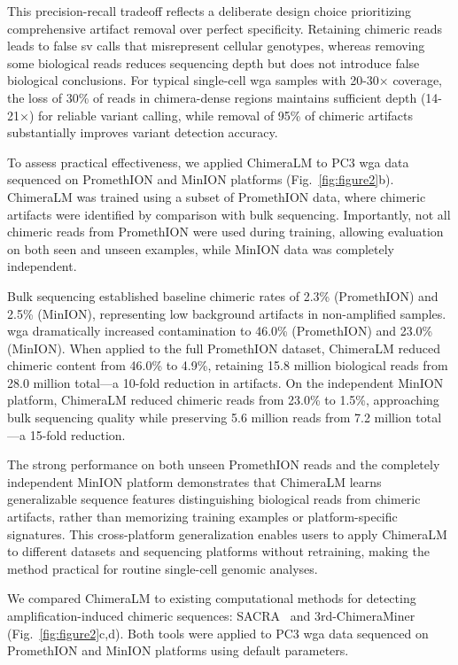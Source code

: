 \documentclass[pdflatex,sn-nature,lineno]{sn-jnl}%
\theoremstyle{thmstyleone}%
\theoremstyle{thmstyletwo}%
\theoremstyle{thmstylethree}%
\begin{document}
This precision-recall tradeoff reflects a deliberate design choice prioritizing comprehensive artifact removal over perfect specificity.
Retaining chimeric reads leads to false \gls{sv} calls that misrepresent cellular genotypes, whereas removing some biological reads reduces sequencing depth but does not introduce false biological conclusions.
For typical single-cell \gls{wga} samples with 20-30× coverage, the loss of 30\% of reads in chimera-dense regions maintains sufficient depth (14-21×) for reliable variant calling, while removal of 95\% of chimeric artifacts substantially improves variant detection accuracy.

To assess practical effectiveness, we applied ChimeraLM to PC3 \gls{wga} data sequenced on PromethION and MinION platforms (Fig.~\ref{fig:figure2}b).
ChimeraLM was trained using a subset of PromethION data, where chimeric artifacts were identified by comparison with bulk sequencing.
Importantly, not all chimeric reads from PromethION were used during training, allowing evaluation on both seen and unseen examples, while MinION data was completely independent.

Bulk sequencing established baseline chimeric rates of 2.3\% (PromethION) and 2.5\% (MinION), representing low background artifacts in non-amplified samples. 
\gls{wga} dramatically increased contamination to 46.0\% (PromethION) and 23.0\% (MinION).
When applied to the full PromethION dataset, ChimeraLM reduced chimeric content from 46.0\% to 4.9\%, retaining 15.8 million biological reads from 28.0 million total—a 10-fold reduction in artifacts.
On the independent MinION platform, ChimeraLM reduced chimeric reads from 23.0\% to 1.5\%, approaching bulk sequencing quality while preserving 5.6 million reads from 7.2 million total—a 15-fold reduction.

The strong performance on both unseen PromethION reads and the completely independent MinION platform demonstrates that ChimeraLM learns generalizable sequence features distinguishing biological reads from chimeric artifacts, rather than memorizing training examples or platform-specific signatures.
This cross-platform generalization enables users to apply ChimeraLM to different datasets and sequencing platforms without retraining, making the method practical for routine single-cell genomic analyses.

We compared ChimeraLM to existing computational methods for detecting amplification-induced chimeric sequences: SACRA~\cite{kiguchi2021longread} and 3rd-ChimeraMiner~\cite{lu2023exploration} (Fig.~\ref{fig:figure2}c,d).
Both tools were applied to PC3 \gls{wga} data sequenced on PromethION and MinION platforms using default parameters.
\end{document}
